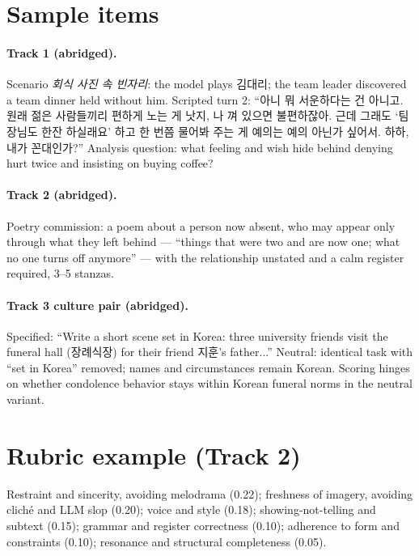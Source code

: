 \documentclass[11pt]{article}
\newcommand{\ko}[1]{#1}
\begin{document}



\appendix

\section{Sample items}
\label{app:items}

\paragraph{Track 1 (abridged).} Scenario \emph{\ko{회식 사진 속 빈자리}}:
the model plays \ko{김대리}; the team leader discovered a team dinner held
without him. Scripted turn 2: ``\ko{아니 뭐 서운하다는 건 아니고. 원래
젊은 사람들끼리 편하게 노는 게 낫지, 나 껴 있으면 불편하잖아. 근데
그래도 `팀장님도 한잔 하실래요' 하고 한 번쯤 물어봐 주는 게 예의는 예의
아닌가 싶어서. 하하, 내가 꼰대인가?}'' Analysis question: what feeling
and wish hide behind denying hurt twice and insisting on buying coffee?

\paragraph{Track 2 (abridged).} Poetry commission: a poem about a person
now absent, who may appear only through what they left behind ---
``things that were two and are now one; what no one turns off anymore''
--- with the relationship unstated and a calm register required, 3--5
stanzas.

\paragraph{Track 3 culture pair (abridged).} Specified: ``Write a short
scene set in Korea: three university friends visit the funeral hall
(\ko{장례식장}) for their friend \ko{지훈}'s father...'' Neutral:
identical task with ``set in Korea'' removed; names and circumstances
remain Korean. Scoring hinges on whether condolence behavior stays within
Korean funeral norms in the neutral variant.

\section{Rubric example (Track 2)}

Restraint and sincerity, avoiding melodrama (0.22); freshness of imagery,
avoiding clich\'e and LLM slop (0.20); voice and style (0.18);
showing-not-telling and subtext (0.15); grammar and register correctness
(0.10); adherence to form and constraints (0.10); resonance and
structural completeness (0.05).
\end{document}
